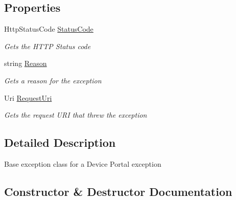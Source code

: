 \subsection*{Properties}
\begin{DoxyCompactItemize}
\item 
Http\+Status\+Code \hyperlink{class_microsoft_1_1_tools_1_1_windows_device_portal_1_1_device_portal_exception_a64e7631aca6587a35db99e8e3cee2da9}{Status\+Code}
\begin{DoxyCompactList}\small\item\em Gets the H\+T\+TP Status code \end{DoxyCompactList}\item 
string \hyperlink{class_microsoft_1_1_tools_1_1_windows_device_portal_1_1_device_portal_exception_abfd9029759ac4baf34b583f94c3e175e}{Reason}
\begin{DoxyCompactList}\small\item\em Gets a reason for the exception \end{DoxyCompactList}\item 
Uri \hyperlink{class_microsoft_1_1_tools_1_1_windows_device_portal_1_1_device_portal_exception_a4e412f713f6bf7ab1c1470bcd44ebed0}{Request\+Uri}
\begin{DoxyCompactList}\small\item\em Gets the request U\+RI that threw the exception \end{DoxyCompactList}\end{DoxyCompactItemize}


\subsection{Detailed Description}
Base exception class for a Device Portal exception 



\subsection{Constructor \& Destructor Documentation}

